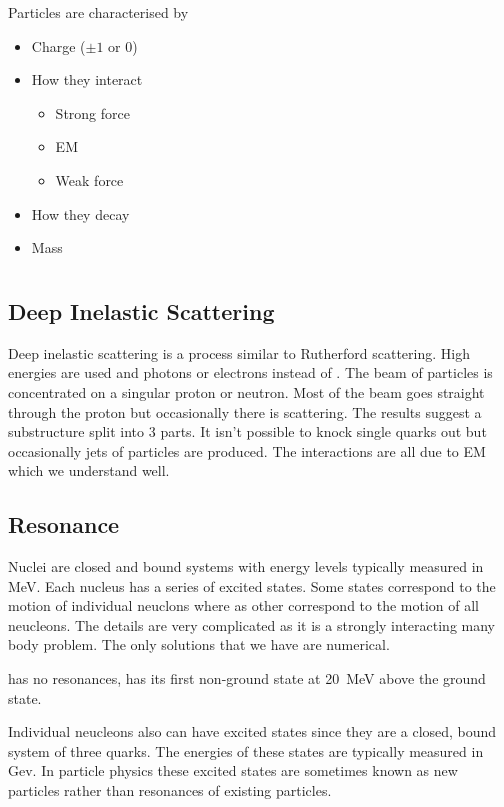 Particles are characterised by
\begin{itemize}
\item Charge (\(\pm 1\) or 0)
\item How they interact
\begin{itemize}
\item Strong force
\item EM
\item Weak force
\end{itemize}
\item How they decay
\item Mass
\end{itemize}

\section{}

\subsection*{Deep Inelastic Scattering}

Deep inelastic scattering is a process similar to Rutherford scattering. High energies are used and photons or electrons instead of \aparticles. The beam of particles is concentrated on a singular proton or neutron. Most of the beam goes straight through the proton but occasionally there is scattering. The results suggest a substructure split into 3 parts. It isn't possible to knock single quarks out but occasionally jets of particles are produced. The interactions are all due to EM which we understand well.

\subsection*{Resonance}

Nuclei are closed and bound systems with energy levels typically measured in \si{MeV}. Each nucleus has a series of excited states. Some states correspond to the motion of individual neuclons where as other correspond to the motion of all neucleons. The details are very complicated as it is a strongly interacting many body problem. The only solutions that we have are numerical.

 has no resonances,  has its first non-ground state at \SI{20}{MeV} above the ground state.

Individual neucleons also can have excited states since they are a closed, bound system of three quarks. The energies of these states are typically measured in \si{Gev}. In particle physics these excited states are sometimes known as new particles rather than resonances of existing particles.

